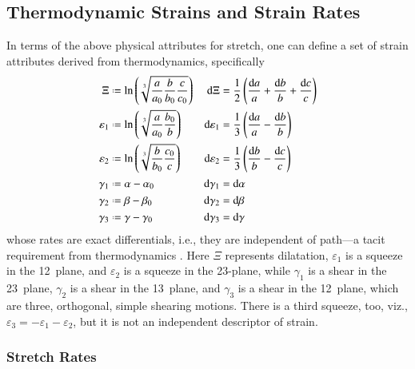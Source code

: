 \subsection{Thermodynamic Strains and Strain Rates}

In terms of the above physical attributes for stretch, one can define a set of strain attributes derived from thermo\-dynamics, specifically \cite{Freed17}
\begin{subequations}
    \label{thermodynamicStrains3D}
    \begin{align}
    \Xi & \defeq \ln \left( \sqrt[3]{\frac{a}{a_0} \frac{b}{b_0} \frac{c}{c_0}} \right) & 
    \mathrm{d} \Xi & = \frac{1}{2} \left( \frac{\mathrm{d}a}{a} + 
    \frac{\mathrm{d}b}{b} + \frac{\mathrm{d}c}{c} \right) \\
    \varepsilon_1 & \defeq \ln \left( \sqrt[3]{\frac{a}{a_0} \frac{b_0}{b}} \right) &
    \mathrm{d} \varepsilon_1 & = \frac{1}{3} \left( \frac{\mathrm{d}a}{a} - 
    \frac{\mathrm{d}b}{b} \right) \\
    \varepsilon_2 & \defeq \ln \left( \sqrt[3]{\frac{b}{b_0} \frac{c_0}{c}} \right) &
    \mathrm{d} \varepsilon_2 & = \frac{1}{3} \left( \frac{\mathrm{d}b}{b} - 
    \frac{\mathrm{d}c}{c} \right) \\
    \gamma_1 & \defeq \alpha - \alpha_0 & 
    \mathrm{d} \gamma_1 & = \mathrm{d} \alpha \\
    \gamma_2 & \defeq \beta - \beta_0 & 
    \mathrm{d} \gamma_2 & = \mathrm{d} \beta \\
    \gamma_3 & \defeq \gamma - \gamma_0 & 
    \mathrm{d} \gamma_3 & = \mathrm{d} \gamma
    \end{align}
\end{subequations}
whose rates are exact differentials, i.e., they are independent of path---a tacit requirement from thermo\-dynamics \cite{Caratheodory09}.  Here $\Xi$ represents dilatation, $\varepsilon_1$ is a squeeze in the 12~plane, and $\varepsilon_2$ is a squeeze in the 23-plane, while $\gamma_1$ is a shear in the 23~plane, $\gamma_2$ is a shear in the 13~plane, and $\gamma_3$ is a shear in the 12~plane, which are three, orthogonal, simple shearing motions.  There is a third squeeze, too, viz., $\varepsilon_3 = -\varepsilon_1 - \varepsilon_2$, but it is not an independent descriptor of strain.

\subsubsection{Stretch Rates}

